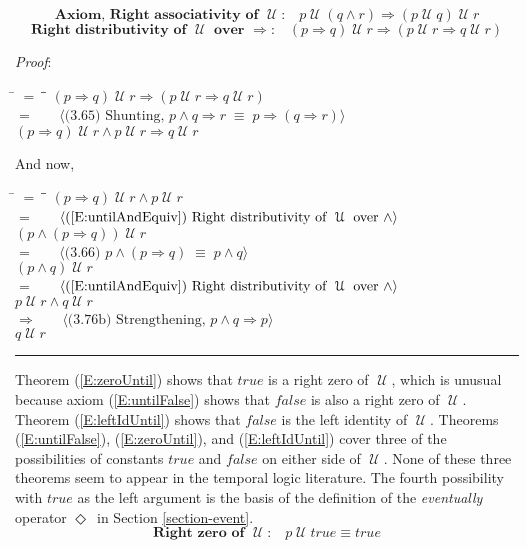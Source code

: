 \documentclass[12pt, fleqn, leqno]{article}
\newcommand{\lgap}{2pt}                             %
\newcommand{\mymathindent}{24pt}                    %
\newcommand{\equivs}{\ensuremath{\;\equiv\;}}       %
\newcommand{\impl}{\ensuremath{\Rightarrow}}        %
\newcommand{\Until}{\;\mathcal{U}\;}
\newcommand{\Event}{\Diamond\,}
\newcommand{\myqed}{\rule[-.23ex]{1.2ex}{2.0ex}}
\newcommand{\myqedtab}{\hspace{384pt}}              %
\newcommand{\firstspacer}{\vspace{-26pt}}
\newcommand{\Gll} {\langle}                         %
\newcommand{\Ggg} {\rangle}                         %
\newcommand{\Hint}[1]     {\ \ \ $\Gll              \mbox{#1} \Ggg$ }   %
\begin{document}
\firstspacer

\begin{equation}\label{E:rightAssocUntil}
\textbf{Axiom, Right associativity of $\Until$:}\quad p \Until (q\land r) \impl (p \Until q) \Until r
\end{equation}
\begin{equation}\label{E:rightUntilImplDist}
\textbf{Right distributivity of $\Until$ over $\impl$:}\quad (p \impl q) \Until r\impl (p \Until r \impl q \Until r)
\end{equation}

\emph{Proof}:
\begin{tabbing}
\hspace{\mymathindent} \= $= \;$ \= \myqedtab \= \kill
  \> \>   $(p \impl q) \Until r\impl (p \Until r \impl q \Until r)$\\[\lgap]
  \> $=$  \>  \Hint{(3.65) Shunting, $p\land q\impl r\equivs p\impl (q\impl r)$}\\[\lgap]
  \> \>   $(p \impl q) \Until r\land p \Until r \impl q \Until r$
\end{tabbing}
And now,
\begin{tabbing}
\hspace{\mymathindent} \= $= \;$ \= \myqedtab \= \kill
  \> \>   $(p \impl q) \Until r\land p \Until r$\\[\lgap]
  \> $=$ \> \Hint{(\ref{E:untilAndEquiv}) Right distributivity of $\Until$ over $\land$} \\[\lgap]
  \> \>   $(p\land (p\impl q)) \Until r$\\[\lgap]
  \> $=$  \>  \Hint{(3.66) $p\land (p \impl q) \equivs p \land q$}\\[\lgap]
  \> \>   $(p\land q) \Until r$\\[\lgap]
  \> $=$ \> \Hint{(\ref{E:untilAndEquiv}) Right distributivity of $\Until$ over $\land$} \\[\lgap]
  \> \>   $p\Until r\land q\Until r$\\[\lgap]
  \> $\impl$ \> \Hint{(3.76b) Strengthening, $p\land q \impl p$} \\[\lgap]
  \> \>   $q\Until r$ \quad \myqed
\end{tabbing}

Theorem (\ref{E:zeroUntil}) shows that $true$ is a right zero of $\Until$, which is unusual because
axiom (\ref{E:untilFalse}) shows that $false$ is also a right zero of $\Until$.
Theorem (\ref{E:leftIdUntil}) shows that $false$ is the left identity of $\Until$.
Theorems (\ref{E:untilFalse}), (\ref{E:zeroUntil}), and (\ref{E:leftIdUntil}) cover three of the
possibilities of constants $true$ and $false$ on either side of $\Until$.
None of these three theorems seem to appear in the temporal logic literature.
The fourth possibility with $true$ as the left argument is the basis of the definition of the \textit{eventually}
operator $\Event$ in Section \ref{section-event}.
\begin{equation}\label{E:zeroUntil}
\textbf{Right zero of $\Until$:}\quad p \Until true \equiv true
\end{equation}
\end{document}
